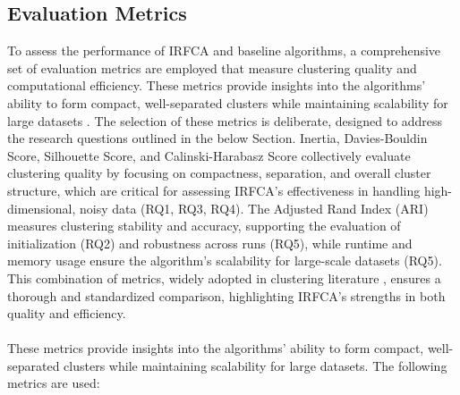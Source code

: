 \documentclass[twoside,11pt]{article}
\renewcommand{\cite}{\citep}
\begin{document}
\subsection{Evaluation Metrics}
To assess the performance of IRFCA and baseline algorithms, a comprehensive set of evaluation metrics are employed that measure clustering quality and computational efficiency. These metrics provide insights into the algorithms’ ability to form compact, well-separated clusters while maintaining scalability for large datasets \cite{jain1988,pedregosa2011}. The selection of these metrics is deliberate, designed to address the research questions outlined in the below Section. Inertia, Davies-Bouldin Score, Silhouette Score, and Calinski-Harabasz Score collectively evaluate clustering quality by focusing on compactness, separation, and overall cluster structure, which are critical for assessing IRFCA’s effectiveness in handling high-dimensional, noisy data (RQ1, RQ3, RQ4). The Adjusted Rand Index (ARI) measures clustering stability and accuracy, supporting the evaluation of initialization (RQ2) and robustness across runs (RQ5), while runtime and memory usage ensure the algorithm’s scalability for large-scale datasets (RQ5). This combination of metrics, widely adopted in clustering literature \cite{calinski1974,davies1979, hubert1985,rousseeuw1987}, ensures a thorough and standardized comparison, highlighting IRFCA’s strengths in both quality and efficiency.\\\\
These metrics provide insights into the algorithms’ ability to form compact, well-separated clusters while maintaining scalability for large datasets. The following metrics are used:\\
\end{document}
